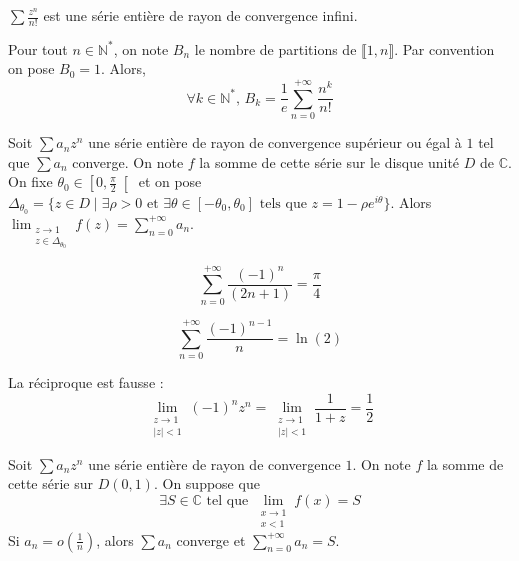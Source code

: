 	\begin{example}
		$\sum \frac{z^n}{n!}$ est une série entière de rayon de convergence infini.
	\end{example}


	\begin{theorem}
		Pour tout $n \in \mathbb{N}^*$, on note $B_n$ le nombre de partitions de $\llbracket 1, n \rrbracket$. Par convention on pose $B_0 = 1$. Alors,
		\[ \forall k \in \mathbb{N}^*, \, B_k = \frac{1}{e} \sum_{n=0}^{+\infty} \frac{n^k}{n!} \]
	\end{theorem}


	\begin{theorem}
		\label{230-1}
		Soit $\sum a_n z^n$ une série entière de rayon de convergence supérieur ou égal à $1$ tel que $\sum a_n$ converge. On note $f$ la somme de cette série sur le disque unité $D$ de $\mathbb{C}$. On fixe $\theta_0 \in \left[ 0, \frac{\pi}{2} \right[$ et on pose $\Delta_{\theta_0} = \{ z \in D \mid \exists \rho > 0 \text{ et } \exists \theta \in [-\theta_0, \theta_0] \text{ tels que } z = 1 - \rho e^{i\theta} \}$.
		\newpar
		Alors $\lim_{\substack{z \rightarrow 1 \\ z \in \Delta_{\theta_0}}} f(z) = \sum_{n=0}^{+\infty} a_n$.
	\end{theorem}

	\begin{application}
		\[ \sum_{n=0}^{+\infty} \frac{(-1)^n}{(2n+1)} = \frac{\pi}{4} \]
	\end{application}

	\begin{application}
		\[ \sum_{n=0}^{+\infty} \frac{(-1)^{n-1}}{n} = \ln(2) \]
	\end{application}

  \begin{cexample}
    La réciproque est fausse :
    \[ \lim_{\substack{z \rightarrow 1 \\ \vert z \vert < 1}} (-1)^n z^n = \lim_{\substack{z \rightarrow 1 \\ \vert z \vert < 1}} \frac{1}{1+z} = \frac{1}{2} \]
  \end{cexample}

	\begin{theorem}
		Soit $\sum a_n z^n$ une série entière de rayon de convergence $1$. On note $f$ la somme de cette série sur $D(0,1)$. On suppose que
		\[ \exists S \in \mathbb{C} \text{ tel que } \lim_{\substack{x \rightarrow 1 \\ x < 1}} f(x) = S \]
		Si $a_n = o \left( \frac{1}{n} \right)$, alors $\sum a_n$ converge et $\sum_{n=0}^{+\infty} a_n = S$.
	\end{theorem}

